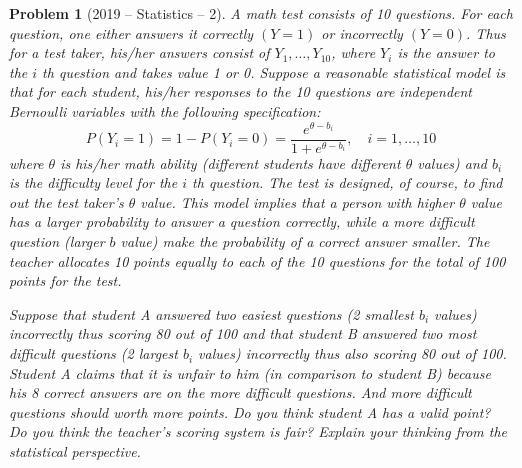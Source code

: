 \documentclass[12pt]{amsart}
\newtheorem{problem}{Problem}
\begin{document}
\begin{problem}[2019 -- Statistics -- 2]
A math test consists of 10 questions. For each question, one either answers it correctly $(Y=1)$ or incorrectly $(Y=0)$. Thus for a test taker, his/her answers consist of $Y_1, \ldots, Y_{10}$, where $Y_i$ is the answer to the $i$ th question and takes value 1 or 0. Suppose a reasonable statistical model is that for each student, his/her responses to the 10 questions are independent Bernoulli variables with the following specification:
$$
P(Y_i=1)=1-P(Y_i=0)=\frac{e^{\theta-b_i}}{1+e^{\theta-b_i}}, \quad i=1, \ldots, 10
$$
where $\theta$ is his/her math ability (different students have different $\theta$ values) and $b_i$ is the difficulty level for the $i$ th question. The test is designed, of course, to find out the test taker's $\theta$ value. This model implies that a person with higher $\theta$ value has a larger probability to answer a question correctly, while a more difficult question (larger $b$ value) make the probability of a correct answer smaller. The teacher allocates 10 points equally to each of the 10 questions for the total of 100 points for the test.

Suppose that student A answered two easiest questions (2 smallest $b_i$ values) incorrectly thus scoring 80 out of 100 and that student B answered two most difficult questions (2 largest $b_i$ values) incorrectly thus also scoring 80 out of 100. Student A claims that it is unfair to him (in comparison to student B) because his 8 correct answers are on the more difficult questions. And more difficult questions should worth more points. Do you think student A has a valid point? Do you think the teacher's scoring system is fair? Explain your thinking from the statistical perspective.
\end{problem}
\end{document}

